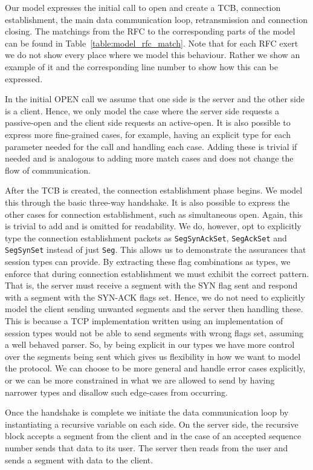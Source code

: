 \documentclass{article}
\newcommand{\type}[1]{\texttt{#1}}
\begin{document}
Our model expresses the initial call to open and create a TCB, connection establishment, the main data communication loop, retransmission and connection closing.
The matchings from the RFC to the corresponding parts of the model can be found in Table~\ref{table:model_rfc_match}.
Note that for each RFC exert we do not show every place where we model this behaviour.
Rather we show an example of it and the corresponding line number to show how this can be expressed.

In the initial OPEN call we assume that one side is the server and the other side is a client.
Hence, we only model the case where the server side requests a passive-open and the client side requests an active-open.
It is also possible to express more fine-grained cases, for example, having an explicit type for each parameter needed for the call and handling each case.
Adding these is trivial if needed and is analogous to adding more match cases and does not change the flow of communication.

After the TCB is created, the connection establishment phase begins.
We model this through the basic three-way handshake.
It is also possible to express the other cases for connection establishment, such as simultaneous open.
Again, this is trivial to add and is omitted for readability.
We do, however, opt to explicitly type the connection establishment packets as \type{SegSynAckSet}, \type{SegAckSet} and \type{SegSynSet} instead of just \type{Seg}.
This allows us to demonstrate the assurances that session types can provide.
By extracting these flag combinations as types, we enforce that during connection establishment we must exhibit the correct pattern.
That is, the server must receive a segment with the SYN flag sent and respond with a segment with the SYN-ACK flags set.
Hence, we do not need to explicitly model the client sending unwanted segments and the server then handling these.
This is because a TCP implementation written using an implementation of session types would not be able to send segments with wrong flags set, assuming a well behaved parser.
So, by being explicit in our types we have more control over the segments being sent which gives us flexibility in how we want to model the protocol.
We can choose to be more general and handle error cases explicitly, or we can be more constrained in what we are allowed to send by having narrower types and disallow such edge-cases from occurring.

Once the handshake is complete we initiate the data communication loop by instantiating a recursive variable on each side.
On the server side, the recursive block accepts a segment from the client and in the case of an accepted sequence number sends that data to its user.
The server then reads from the user and sends a segment with data to the client.
\end{document}
